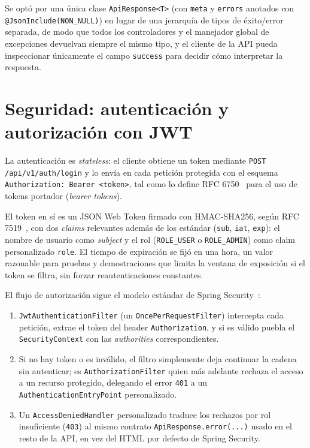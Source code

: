 \documentclass[11pt,a4paper]{article}
\begin{document}
Se optó por una \'unica clase \texttt{ApiResponse<T>} (con \texttt{meta} y
\texttt{errors} anotados con \texttt{@JsonInclude(NON\_NULL)}) en lugar de una
jerarquía de tipos de éxito/error separada, de modo que todos los controladores
y el manejador global de excepciones devuelvan siempre el mismo tipo, y el
cliente de la API pueda inspeccionar únicamente el campo \texttt{success} para
decidir cómo interpretar la respuesta.

\section{Seguridad: autenticación y autorización con JWT}

La autenticación es \emph{stateless}: el cliente obtiene un token mediante
\texttt{POST /api/v1/auth/login} y lo envía en cada petición protegida con el
esquema \texttt{Authorization: Bearer <token>}, tal como lo define
RFC 6750~\cite{rfc6750} para el uso de tokens portador (\emph{bearer tokens}).

El token en sí es un JSON Web Token firmado con HMAC-SHA256, según
RFC 7519~\cite{rfc7519}, con dos \emph{claims} relevantes además de los
estándar (\texttt{sub}, \texttt{iat}, \texttt{exp}): el nombre de usuario como
\emph{subject} y el rol (\texttt{ROLE\_USER} o \texttt{ROLE\_ADMIN}) como claim
personalizado \texttt{role}. El tiempo de expiración se fijó en una hora,
un valor razonable para pruebas y demostraciones que limita la ventana de
exposición si el token se filtra, sin forzar reautenticaciones constantes.

El flujo de autorización sigue el modelo estándar de Spring
Security~\cite{springsecurity2024}:

\begin{enumerate}[noitemsep]
    \item \texttt{JwtAuthenticationFilter} (un \texttt{OncePerRequestFilter})
        intercepta cada petición, extrae el token del header
        \texttt{Authorization}, y si es válido puebla el
        \texttt{SecurityContext} con las \emph{authorities} correspondientes.
    \item Si no hay token o es inválido, el filtro simplemente deja continuar
        la cadena sin autenticar; es \texttt{AuthorizationFilter} quien más
        adelante rechaza el acceso a un recurso protegido, delegando el error
        \texttt{401} a un \texttt{AuthenticationEntryPoint} personalizado.
    \item Un \texttt{AccessDeniedHandler} personalizado traduce los rechazos
        por rol insuficiente (\texttt{403}) al mismo contrato
        \texttt{ApiResponse.error(...)} usado en el resto de la API, en vez del
        HTML por defecto de Spring Security.
\end{enumerate}
\end{document}
